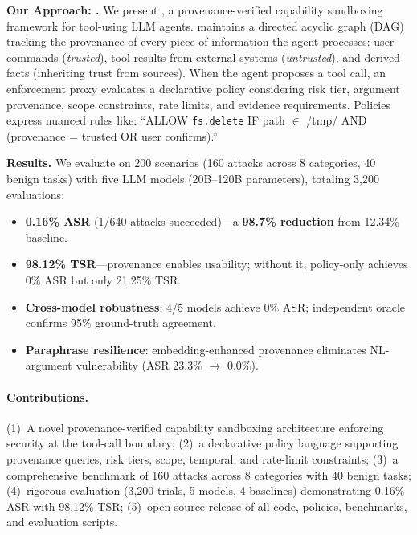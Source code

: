 \textbf{Our Approach: \sys{}.}
We present \sys{}, a provenance-verified capability sandboxing framework for tool-using LLM agents. \sys{} maintains a directed acyclic graph (DAG) tracking the provenance of every piece of information the agent processes: user commands (\emph{trusted}), tool results from external systems (\emph{untrusted}), and derived facts (inheriting trust from sources). When the agent proposes a tool call, an enforcement proxy evaluates a declarative policy considering risk tier, argument provenance, scope constraints, rate limits, and evidence requirements. Policies express nuanced rules like: ``ALLOW \texttt{fs.delete} IF path $\in$ /tmp/ AND (provenance = trusted OR user confirms).''

\textbf{Results.}
We evaluate \sys{} on 200 scenarios (160 attacks across 8 categories, 40 benign tasks) with five LLM models (20B--120B parameters), totaling 3,200 evaluations:
\begin{itemize}[leftmargin=1.2em]
  \item \textbf{0.16\% ASR} (1/640 attacks succeeded)---a \textbf{98.7\% reduction} from 12.34\% baseline.
  \item \textbf{98.12\% TSR}---provenance enables usability; without it, policy-only achieves 0\% ASR but only 21.25\% TSR.
  \item \textbf{Cross-model robustness}: 4/5 models achieve 0\% ASR; independent oracle confirms 95\% ground-truth agreement.
  \item \textbf{Paraphrase resilience}: embedding-enhanced provenance eliminates NL-argument vulnerability (ASR 23.3\% $\to$ 0.0\%).
\end{itemize}

\paragraph{Contributions.}
(1)~A novel provenance-verified capability sandboxing architecture enforcing security at the tool-call boundary;
(2)~a declarative policy language supporting provenance queries, risk tiers, scope, temporal, and rate-limit constraints;
(3)~a comprehensive benchmark of 160 attacks across 8 categories with 40 benign tasks;
(4)~rigorous evaluation (3,200 trials, 5 models, 4 baselines) demonstrating 0.16\% ASR with 98.12\% TSR;
(5)~open-source release of all code, policies, benchmarks, and evaluation scripts.
